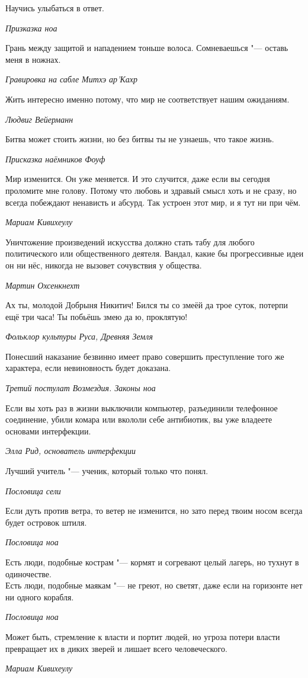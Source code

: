 \documentclass[a4paper,10pt]{book}
\newcommand{\mulang}[3]{#2}%
\begin{document}
\epigraph{Научись улыбаться в ответ.}
{\textit{Призказка ноа}}

\epigraph{Грань между защитой и нападением тоньше волоса. Сомневаешься "--- оставь меня в ножнах.}
{\textit{Гравировка на сабле Митхэ ар'Кахр}}

\epigraph{Жить интересно именно потому, что мир не соответствует нашим ожиданиям.}
{\textit{Людвиг Вейерманн}}

\epigraph{\mulang{}{Битва может стоить жизни, но без битвы ты не узнаешь, что такое жизнь.}
{Battle may take your life, but escaping battle you'll never know what life is.}}
{\textit{Присказка наёмников Фоуф}}

\epigraph{Мир изменится. Он уже меняется. И это случится, даже если вы сегодня проломите мне голову.
Потому что любовь и здравый смысл хоть и не сразу, но всегда побеждают ненависть и абсурд.
Так устроен этот мир, и я тут ни при чём.}
{\textit{Мариам Кивихеулу}}

\epigraph{Уничтожение произведений искусства должно стать табу для любого политического или общественного деятеля. Вандал, какие бы прогрессивные идеи он ни нёс, никогда не вызовет сочувствия у общества.}
{\textit{Мартин Охсенкнехт}}

\epigraph{Ах ты, молодой Добрыня Никитич! Бился ты со змеёй да трое суток, потерпи ещё три часа! Ты побьёшь змею да ю, проклятую!}
{\textit{Фольклор культуры Руса, Древняя Земля}}

\epigraph{Понесший наказание безвинно имеет право совершить преступление того же характера, если невиновность будет доказана.}
{\textit{Третий постулат Возмездия. Законы ноа}}

\epigraph{Если вы хоть раз в жизни выключили компьютер, разъединили телефонное соединение, убили комара или вкололи себе антибиотик, вы уже владеете основами интерфекции.}
{\textit{Элла Рид, основатель интерфекции}}

\epigraph{Лучший учитель "--- ученик, который только что понял.}
{\textit{Пословица сели}}

\epigraph{Если дуть против ветра, то ветер не изменится, но зато перед твоим носом всегда будет островок штиля.}
{\textit{Пословица ноа}}

\epigraph{Есть люди, подобные кострам "--- кормят и согревают целый лагерь, но тухнут в одиночестве.\\
Есть люди, подобные маякам "--- не греют, но светят, даже если на горизонте нет ни одного корабля.}
{\textit{Пословица ноа}}

\epigraph{Может быть, стремление к власти и портит людей, но угроза потери власти превращает их в диких зверей и лишает всего человеческого.}
{\textit{Мариам Кивихеулу}}
\end{document}
